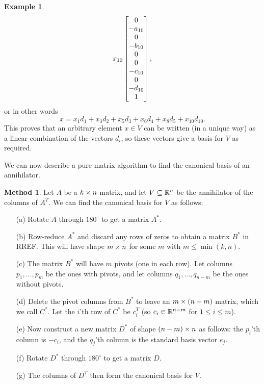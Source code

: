 \documentclass[reqno]{amsart}
\theoremstyle{definition}
\newtheorem{example}[theorem]{Example}
\newtheorem{method}[theorem]{Method}
\begin{document}
\begin{example}
\[     x_{10} \left[\begin{matrix} 0 \\ -a_{10} \\  0  \\ -b_{10} \\  0  \\  0  \\ -c_{10} \\  0  \\ -d_{10} \\  1  \end{matrix}\right],
 \]
 or in other words
 \[ x = x_1d_1 + x_3d_2 + x_5d_3 + x_6d_4 + x_8d_5 + x_{10}d_{10}. \]
 This proves that an arbitrary element $x\in V$ can be written (in
 a unique way) as a linear combination of the vectors $d_i$, so these
 vectors give a basis for $V$ as required.
\end{example}

We can now describe a pure matrix algorithm to find the canonical
basis of an annihilator.

\begin{method}\label{meth-ann-basis-matrix}
 Let $A$ be a $k\times n$ matrix, and let $V\subseteq{\mathbb{R}}^n$ be the annihilator
 of the columns of $A^T$.  We can find the canonical basis for $V$ as
 follows:
 \begin{itemize}
  \item[(a)] Rotate $A$ through $180^\circ$ to get a matrix $A^*$.
  \item[(b)] Row-reduce $A^*$ and discard any rows of zeros to obtain
   a matrix $B^*$ in RREF.  This will have shape $m\times n$ for some
   $m$ with $m\leq\min(k,n)$.
  \item[(c)] The matrix $B^*$ will have $m$ pivots (one in each row).
   Let columns $p_1,\dotsc,p_m$ be the ones with pivots, and let
   columns $q_1,\dotsc,q_{n-m}$ be the ones without pivots.
  \item[(d)] Delete the pivot columns from $B^*$ to leave an $m\times(n-m)$
   matrix, which we call $C^*$.  Let the $i$'th row of $C^*$ be $c_i^T$
   (so $c_i\in{\mathbb{R}}^{n-m}$ for $1\leq i\leq m$).
  \item[(e)] Now construct a new matrix $D^*$ of shape $(n-m)\times n$ as
   follows: the $p_i$'th column is $-c_i$, and the $q_j$'th column is
   the standard basis vector $e_j$.
  \item[(f)] Rotate $D^*$ through $180^\circ$ to get a matrix $D$.
  \item[(g)] The columns of $D^T$ then form the canonical basis for $V$.
 \end{itemize}
\end{method}
\end{document}
